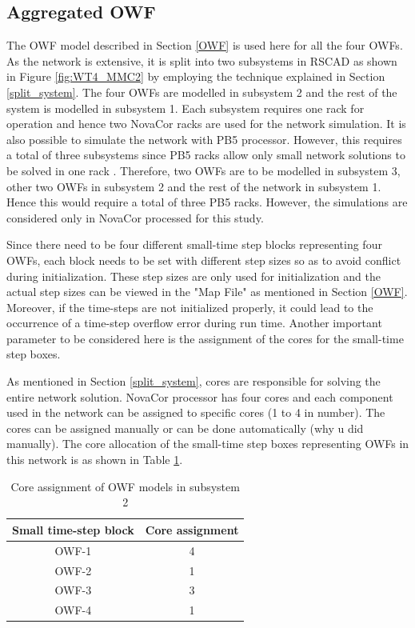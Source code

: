 \subsection{Aggregated OWF}\label{Aggregated_OWF_large_scale}
The \gls{OWF} model described in Section \ref{OWF} is used here for all the four \gls{OWF}s. As the network is extensive, it is split into two subsystems in RSCAD as shown in Figure \ref{fig:WT4_MMC2} by employing the technique explained in Section \ref{split_system}. The four \gls{OWF}s are modelled in subsystem 2 and the rest of the system is modelled in subsystem 1. Each subsystem requires one rack for operation and hence two NovaCor racks are used for the network simulation. It is also possible to simulate the network with PB5 processor. However, this requires a total of three subsystems since PB5 racks allow only small network solutions to be solved in one rack \cite{noauthor_pb5_nodate}. Therefore, two \gls{OWF}s are to be modelled in subsystem 3, other two \gls{OWF}s in subsystem 2 and the rest of the network in subsystem 1. Hence this would require a total of three PB5 racks. However, the simulations are considered only in NovaCor processed for this study.  


Since there need to be four different small-time step blocks representing four \gls{OWF}s, each block needs to be set with different step sizes so as to avoid conflict during initialization. These step sizes are only used for initialization and the actual step sizes can be viewed in the "Map File" as mentioned in Section \ref{OWF}. Moreover, if the time-steps are not initialized properly, it could lead to the occurrence of a time-step overflow error during run time. Another important parameter to be considered here is the assignment of the cores for the small-time step boxes. 

As mentioned in Section \ref{split_system}, cores are responsible for solving the entire network solution. NovaCor processor has four cores and each component used in the network can be assigned to specific cores (1 to 4 in number). The cores can be assigned manually or can be done automatically (why u did manually). The core allocation of the small-time step boxes representing \gls{OWF}s in this network is as shown in Table \ref{tab:Core_assignment_sub2}.  

   

\begin{table}[H]
\centering
\begin{tabular}{|c|c|}
\hline
\textbf{Small time-step block} & \textbf{Core assignment} \\ \hline
OWF-1                          & 4                        \\ \hline
OWF-2                          & 1                        \\ \hline
OWF-3                          & 3                        \\ \hline
OWF-4                          & 1                        \\ \hline
\end{tabular}
\caption{Core assignment of OWF models in subsystem 2}
\label{tab:Core_assignment_sub2}
\end{table}

